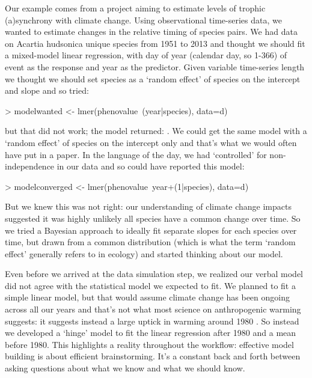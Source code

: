 \documentclass[11pt]{article}
\begin{document}
Our example comes from a project aiming to estimate levels of trophic (a)synchrony with climate change. Using observational time-series data, we wanted to estimate changes in the relative timing of species pairs. We had data on Acartia hudsonica unique species from 1951 to 2013  and thought we should fit a mixed-model linear regression, with day of year (calendar day, so 1-366) of event as the response and year as the predictor. Given variable time-series length we thought we should set species as a `random effect' of species on the intercept and slope and so tried:

\begin{Schunk}
\begin{Sinput}
> modelwanted <- lmer(phenovalue~(year|species), data=d) 
\end{Sinput}
\end{Schunk}

but that did not work; the model returned: . We could get the same model with a `random effect' of species on the intercept only and that's what we would often have put in a paper. In the language of the day, we had `controlled' for non-independence in our data and so could have reported this model:

\begin{Schunk}
\begin{Sinput}
> modelconverged <- lmer(phenovalue~year+(1|species), data=d)
\end{Sinput}
\end{Schunk}

But we knew this was not right: our understanding of climate change impacts suggested it was highly unlikely all species have a common change over time. So we tried a Bayesian approach to ideally fit separate slopes for each species over time, but drawn from a common distribution (which is what the term `random effect' generally refers to in ecology) and started thinking about our model. 

Even before we arrived at the data simulation step, we realized our verbal model did not agree with the statistical model we expected to fit. We planned to fit a simple linear model, but that would assume climate change has been ongoing across all our years and that's not what most science on anthropogenic warming suggests: it suggests instead a large uptick in warming around 1980 \citep[likely do to effects of aerosols,][]{Booth2012}. So instead we developed a `hinge' model to fit the linear regression after 1980 and a mean before 1980. This highlights a reality throughout the workflow: effective model building is about efficient brainstorming. It's a constant back and forth between asking questions about what we know and what we should know. 
\end{document}
